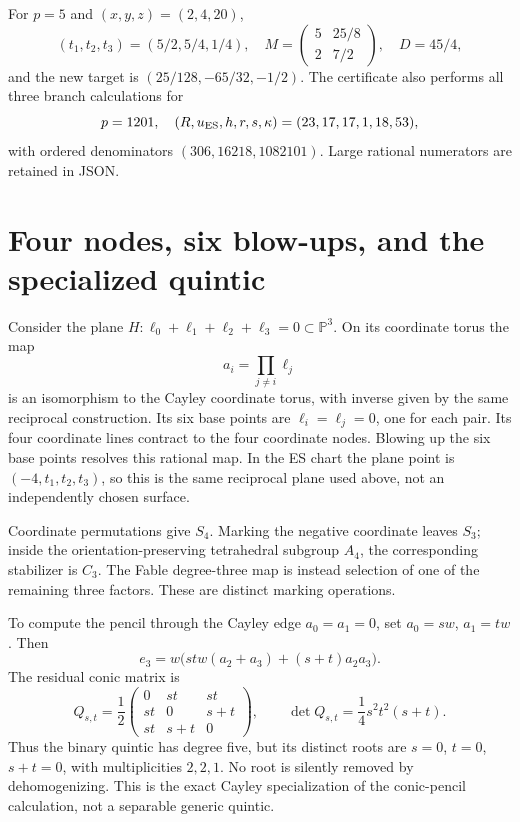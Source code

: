\documentclass[11pt]{article}
\theoremstyle{remark}\newtheorem{remark}[theorem]{Remark}
\newcommand{\PP}{\mathbb P}\newcommand{\Res}{\operatorname{Res}}
\begin{document}
For $p=5$ and $(x,y,z)=(2,4,20)$,
\[
 (t_1,t_2,t_3)=(5/2,5/4,1/4),\quad
 M=\begin{pmatrix}5&25/8\\2&7/2\end{pmatrix},\quad D=45/4,
\]
and the new target is $(25/128,-65/32,-1/2)$. The certificate also performs all three branch calculations for
\[
 p=1201,\quad(R,u_{\rm ES},h,r,s,\kappa)=(23,17,17,1,18,53),
\]
with ordered denominators $(306,16218,1082101)$. Large rational numerators are retained in JSON.

\section{Four nodes, six blow-ups, and the specialized quintic}
Consider the plane $H:\ell_0+\ell_1+\ell_2+\ell_3=0\subset\PP^3$. On its coordinate torus the map
\begin{equation}\label{eq:cremona}
 a_i=\prod_{j\ne i}\ell_j
\end{equation}
is an isomorphism to the Cayley coordinate torus, with inverse given by the same reciprocal construction. Its six base points are $\ell_i=\ell_j=0$, one for each pair. Its four coordinate lines contract to the four coordinate nodes. Blowing up the six base points resolves this rational map. In the ES chart the plane point is $(-4,t_1,t_2,t_3)$, so this is the same reciprocal plane used above, not an independently chosen surface.

Coordinate permutations give $S_4$. Marking the negative coordinate leaves $S_3$; inside the orientation-preserving tetrahedral subgroup $A_4$, the corresponding stabilizer is $C_3$. The Fable degree-three map is instead selection of one of the remaining three factors. These are distinct marking operations.

To compute the pencil through the Cayley edge $a_0=a_1=0$, set
$a_0=sw$, $a_1=tw$. Then
\[
 e_3=w\bigl(stw(a_2+a_3)+(s+t)a_2a_3\bigr).
\]
The residual conic matrix is
\[
 Q_{s,t}=\frac12\begin{pmatrix}
 0&st&st\\st&0&s+t\\st&s+t&0
 \end{pmatrix},
\qquad
 \boxed{\det Q_{s,t}=\frac14s^2t^2(s+t).}
\]
Thus the binary quintic has degree five, but its distinct roots are $s=0$, $t=0$, $s+t=0$, with multiplicities $2,2,1$. No root is silently removed by dehomogenizing. This is the exact Cayley specialization of the conic-pencil calculation, not a separable generic quintic.
\end{document}
